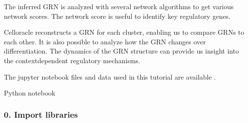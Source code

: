 \documentclass[letterpaper,10pt,english]{sphinxmanual}
\begin{document}
The inferred GRN is analyzed with several network algorithms to get various network scores. The network score is useful to identify key regulatory genes.

Celloracle reconstructs a GRN for each cluster, enabling us to compare GRNs to each other. It is also possible to analyze how the GRN changes over differentiation.
The dynamics of the GRN structure can provide us insight into the context\sphinxhyphen{}dependent regulatory mechanisms.

The jupyter notebook files and data used in this tutorial are available  .

Python notebook


\subsubsection{0. Import libraries}
\label{\detokenize{notebooks/04_Network_analysis/Network_analysis_with_Paul_etal_2015_data:0.-Import-libraries}}\label{\detokenize{notebooks/04_Network_analysis/Network_analysis_with_Paul_etal_2015_data::doc}}
{
\begin{sphinxVerbatim}[commandchars=\\\{\}]
\llap{\color{nbsphinxin}[1]:\,\hspace{\fboxrule}\hspace{\fboxsep}}

 
 

   
   
   
   
   

\end{sphinxVerbatim}
}

{
\begin{sphinxVerbatim}[commandchars=\\\{\}]
\llap{\color{nbsphinxin}[2]:\,\hspace{\fboxrule}\hspace{\fboxsep}}   
\end{sphinxVerbatim}
}
\end{document}
